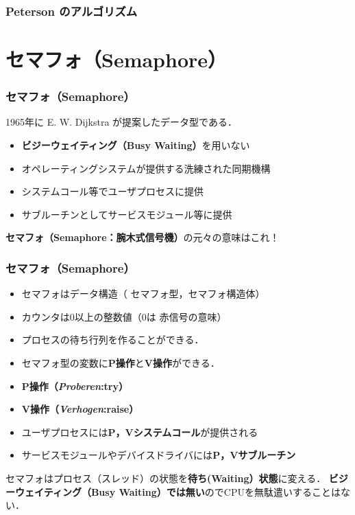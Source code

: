 \documentclass[unicode]{beamer}                   %
\begin{document}
\begin{frame}
  \frametitle{Peterson のアルゴリズム}
\end{frame}

\section{セマフォ（Semaphore）}
\begin{frame}
  \frametitle{セマフォ（Semaphore）}
  1965年に E. W. Dijkstra が提案したデータ型である．
  \begin{itemize}
  \item {\bf ビジーウェイティング（Busy Waiting）}を用いない
  \item オペレーティングシステムが提供する洗練された同期機構
  \item システムコール等でユーザプロセスに提供
  \item サブルーチンとしてサービスモジュール等に提供
  \end{itemize}

{\bf セマフォ（Semaphore：腕木式信号機）}の元々の意味はこれ！

\end{frame}

\begin{frame}
  \frametitle{セマフォ（Semaphore）}
  \begin{itemize}
  \item セマフォはデータ構造（{\color{red} セマフォ型}，セマフォ構造体）
  \item カウンタは0以上の整数値（0は{\color{red} 赤信号}の意味）
  \item プロセスの待ち行列を作ることができる．
  \item セマフォ型の変数に{\bf P操作}と{\bf V操作}ができる．
  \item {\bf P操作（{\it Proberen}:try）}
  \item {\bf V操作（{\it Verhogen}:raise）}
  \item ユーザプロセスには{\bf P，Vシステムコール}が提供される
  \item サービスモジュールやデバイスドライバには{\bf P，Vサブルーチン}
  \end{itemize}

セマフォはプロセス（スレッド）の状態を{\bf 待ち(Waiting）状態}に変える．
{\bf ビジーウェイティング（Busy Waiting）では無い}のでCPUを無駄遣いすることはない．
\end{frame}
\end{document}
